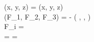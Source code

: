 (x, y, z) = \nabla \phi(x, y, z) \implies\\
(F_1, F_2, F_3) = -
\left(
,
,
\right) \implies\\
F_i =  \implies\\

 =
 =
